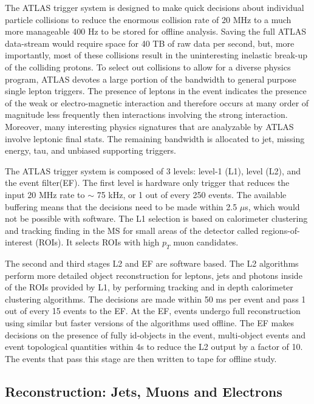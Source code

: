 The ATLAS trigger system is designed to make quick decisions about individual particle collisions to reduce the enormous collision rate of 20 MHz to a much more manageable 400 Hz to be stored for offline analysis. Saving the full ATLAS data-stream would require space for 40 TB of raw data per second, but, more importantly, most of these collisions result in the uninteresting inelastic break-up of the colliding protons. To select out collisions to allow for a diverse physics program, ATLAS devotes a large portion of the bandwidth to general purpose single lepton triggers. The presence of leptons in the event indicates the presence of the weak or electro-magnetic interaction and therefore occurs at many order of magnitude less frequently then interactions involving the strong interaction. Moreover, many interesting physics signatures that are analyzable by ATLAS involve leptonic final stats. The remaining bandwidth is allocated to jet, missing energy, tau, and unbiased supporting triggers.

The ATLAS trigger system is composed of 3 levels: level-1 (L1), level (L2), and the event filter(EF). The first level is hardware only trigger that reduces the input 20 MHz rate to $\sim$ 75 kHz, or 1 out of every 250 events. The available buffering means that the decisions need to be made within 2.5 $\mu$s, which would not be possible with software. The L1 selection is based on calorimeter clustering and tracking finding in the MS for small areas of the detector called regions-of-interest (ROIs). It selects ROIs with high $p_T$ muon candidates.

The second and third stages L2 and EF are software based. The L2 algorithms perform more detailed object reconstruction for leptons, jets and photons inside of the ROIs provided by L1, by performing tracking and in depth calorimeter clustering algorithms. The decisions are made within 50 ms per event and pass 1 out of every 15 events to the EF. At the EF, events undergo full reconstruction using similar but faster versions of the algorithms used offline. The EF makes decisions on the presence of fully id-objects in the event, multi-object events and event topological quantities within 4s to reduce the L2 output by a factor of 10. The events that pass this stage are then written to tape for offline study.



\subsection{Reconstruction: Jets, Muons and Electrons}

